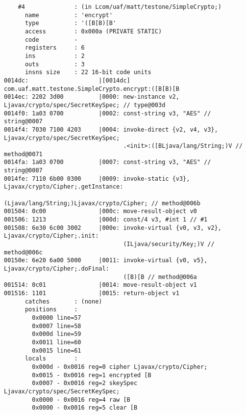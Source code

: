 \begin{lstlisting}
    #4              : (in Lcom/uaf/matt/testone/SimpleCrypto;)
      name          : 'encrypt'
      type          : '([B[B)[B'
      access        : 0x000a (PRIVATE STATIC)
      code          -
      registers     : 6
      ins           : 2
      outs          : 3
      insns size    : 22 16-bit code units
0014dc:                    |[0014dc] com.uaf.matt.testone.SimpleCrypto.encrypt:([B[B)[B
0014ec: 2202 3d00          |0000: new-instance v2, Ljavax/crypto/spec/SecretKeySpec; // type@003d
0014f0: 1a03 0700          |0002: const-string v3, "AES" // string@0007
0014f4: 7030 7100 4203     |0004: invoke-direct {v2, v4, v3}, Ljavax/crypto/spec/SecretKeySpec;
                                  .<init>:([BLjava/lang/String;)V // method@0071
0014fa: 1a03 0700          |0007: const-string v3, "AES" // string@0007
0014fe: 7110 6b00 0300     |0009: invoke-static {v3}, Ljavax/crypto/Cipher;.getInstance:
                                  (Ljava/lang/String;)Ljavax/crypto/Cipher; // method@006b
001504: 0c00               |000c: move-result-object v0
001506: 1213               |000d: const/4 v3, #int 1 // #1
001508: 6e30 6c00 3002     |000e: invoke-virtual {v0, v3, v2}, Ljavax/crypto/Cipher;.init:
                                  (ILjava/security/Key;)V // method@006c
00150e: 6e20 6a00 5000     |0011: invoke-virtual {v0, v5}, Ljavax/crypto/Cipher;.doFinal:
                                  ([B)[B // method@006a
001514: 0c01               |0014: move-result-object v1
001516: 1101               |0015: return-object v1
      catches       : (none)
      positions     :
        0x0000 line=57
        0x0007 line=58
        0x000d line=59
        0x0011 line=60
        0x0015 line=61
      locals        :
        0x000d - 0x0016 reg=0 cipher Ljavax/crypto/Cipher;
        0x0015 - 0x0016 reg=1 encrypted [B
        0x0007 - 0x0016 reg=2 skeySpec Ljavax/crypto/spec/SecretKeySpec;
        0x0000 - 0x0016 reg=4 raw [B
        0x0000 - 0x0016 reg=5 clear [B


\end{lstlisting}

